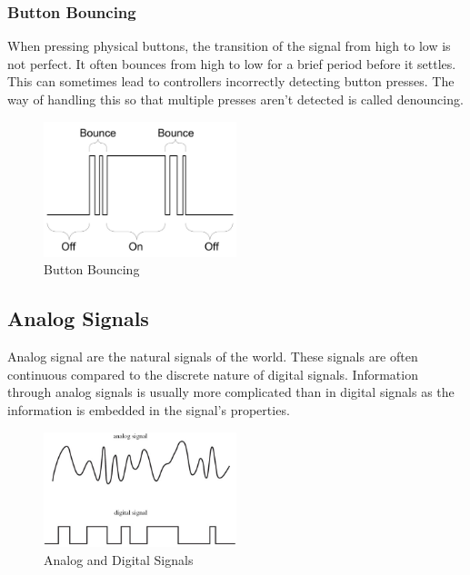 \documentclass[12pt]{article}
\begin{document}
\subsubsection{Button Bouncing}

When pressing physical buttons, the transition of the signal from high to low is not perfect. It often bounces from high to low for a brief period before it settles. This can sometimes lead to controllers incorrectly detecting button presses. The way of handling this so that multiple presses aren't detected is called denouncing. 

\begin{figure}[h]
    \centering
    \includegraphics[width=0.5\textwidth]{bouncing.jpg}
    \caption{Button Bouncing}
    \label{fig:bouncing}
\end{figure}


\subsection{Analog Signals}

Analog signal are the natural signals of the world. These signals are often continuous compared to the discrete nature of digital signals. Information through analog signals is usually more complicated than in digital signals as the information is embedded in the signal's properties.

\begin{figure}[h]
    \centering
    \includegraphics[width=0.5\textwidth]{signals.jpg}
    \caption{Analog and Digital Signals}
    \label{fig:bouncing}
\end{figure}
\end{document}
